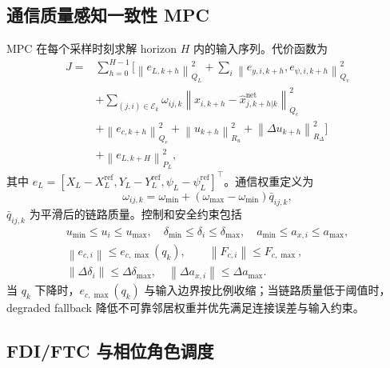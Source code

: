 \documentclass[twocolumn,3p,times,procedia]{elsarticle}
\newcommand{\norm}[1]{\left\lVert #1 \right\rVert}
\begin{document}
\subsection{通信质量感知一致性 MPC}

MPC 在每个采样时刻求解 horizon $H$ 内的输入序列。代价函数为
\begin{equation}
\begin{aligned}
J=&\sum_{h=0}^{H-1}
\Big[
\norm{e_{L,k+h}}_{Q_L}^2+
\sum_i\norm{e_{y,i,k+h},e_{\psi,i,k+h}}_{Q_v}^2\\
&+\sum_{(j,i)\in\mathcal E_k}\omega_{ij,k}\norm{x_{i,k+h}-\hat x_{j,k+h|k}^{\mathrm{net}}}_{Q_c}^2\\
&+\norm{e_{c,k+h}}_{Q_e}^2+
\norm{u_{k+h}}_{R_u}^2+
\norm{\Delta u_{k+h}}_{R_\Delta}^2
\Big]\\
&+\norm{e_{L,k+H}}_{P_L}^2 ,
\end{aligned}
\label{eq:mpc_cost}
\end{equation}
其中 $e_L=[X_L-X_L^{\mathrm{ref}},Y_L-Y_L^{\mathrm{ref}},\psi_L-\psi_L^{\mathrm{ref}}]^\top$。通信权重定义为
\begin{equation}
\omega_{ij,k}=\omega_{\min}+(\omega_{\max}-\omega_{\min})\bar q_{ij,k},
\label{eq:comm_weight}
\end{equation}
$\bar q_{ij,k}$ 为平滑后的链路质量。控制和安全约束包括
\begin{equation}
\begin{gathered}
u_{\min}\le u_i\le u_{\max},\quad
\delta_{\min}\le\delta_i\le\delta_{\max},\quad
a_{\min}\le a_{x,i}\le a_{\max},\\
\norm{e_{c,i}}\le e_{c,\max}(q_k),\qquad
\norm{F_{c,i}}\le F_{c,\max},\\
\norm{\Delta \delta_i}\le \Delta\delta_{\max},\quad
\norm{\Delta a_{x,i}}\le \Delta a_{\max}.
\end{gathered}
\label{eq:constraints}
\end{equation}
当 $q_k$ 下降时，$e_{c,\max}(q_k)$ 与输入边界按比例收缩；当链路质量低于阈值时，degraded fallback 降低不可靠邻居权重并优先满足连接误差与输入约束。

\subsection{FDI/FTC 与相位角色调度}
\end{document}
